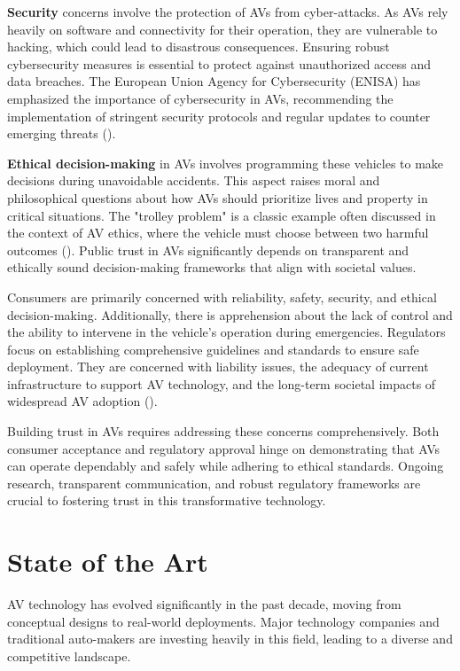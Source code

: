 \textbf{Security} concerns involve the protection of AVs from cyber-attacks. As AVs rely heavily on software and connectivity for their operation, they are vulnerable to hacking, which could lead to disastrous consequences. Ensuring robust cybersecurity measures is essential to protect against unauthorized access and data breaches. The European Union Agency for Cybersecurity (ENISA) has emphasized the importance of cybersecurity in AVs, recommending the implementation of stringent security protocols and regular updates to counter emerging threats (\cite{enisa2020}).

\textbf{Ethical decision-making} in AVs involves programming these vehicles to make decisions during unavoidable accidents. This aspect raises moral and philosophical questions about how AVs should prioritize lives and property in critical situations. The "trolley problem" is a classic example often discussed in the context of AV ethics, where the vehicle must choose between two harmful outcomes (\cite{Lin2015}). Public trust in AVs significantly depends on transparent and ethically sound decision-making frameworks that align with societal values.

Consumers are primarily concerned with reliability, safety, security, and ethical decision-making. Additionally, there is apprehension about the lack of control and the ability to intervene in the vehicle's operation during emergencies. Regulators focus on establishing comprehensive guidelines and standards to ensure safe deployment. They are concerned with liability issues, the adequacy of current infrastructure to support AV technology, and the long-term societal impacts of widespread AV adoption (\cite{litman2020}).

Building trust in AVs requires addressing these concerns comprehensively. Both consumer acceptance and regulatory approval hinge on demonstrating that AVs can operate dependably and safely while adhering to ethical standards. Ongoing research, transparent communication, and robust regulatory frameworks are crucial to fostering trust in this transformative technology.

\section{State of the Art}

AV technology has evolved significantly in the past decade, moving from conceptual designs to real-world deployments. Major technology companies and traditional auto-makers are investing heavily in this field, leading to a diverse and competitive landscape.

